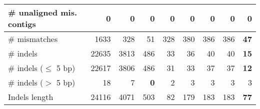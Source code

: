 \documentclass[12pt,a4paper]{article}
\begin{document}
\begin{table}[ht]
\begin{center}
\begin{tabular}{|l*{8}{|r}|}
\# unaligned mis. contigs & 0 & 0 & 0 & 0 & 0 & 0 & 0 & 0 \\ \hline
\# mismatches & 1633 & 328 & 51 & 328 & 380 & 386 & 386 & {\bf 47} \\ \hline
\# indels & 22635 & 3813 & 486 & 33 & 36 & 40 & 40 & {\bf 15} \\ \hline
\hspace{5mm}\# indels ($\leq$ 5 bp) & 22617 & 3806 & 486 & 31 & 33 & 37 & 37 & {\bf 12} \\ \hline
\hspace{5mm}\# indels ($>$ 5 bp) & 18 & 7 & {\bf 0} & 2 & 3 & 3 & 3 & 3 \\ \hline
Indels length & 24116 & 4071 & 503 & 82 & 179 & 183 & 183 & {\bf 77} \\ \hline
\end{tabular}
\end{center}
\end{table}
\end{document}
